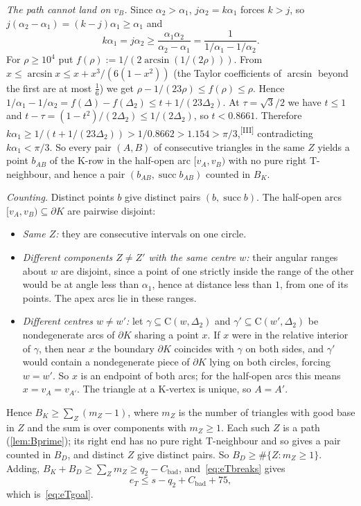 \documentclass[11pt]{amsart}
\theoremstyle{definition}
\theoremstyle{remark}
\newcommand{\Dt}{\Delta_2}
\newcommand{\Cc}{\mathrm{C}}      %
\newcommand{\chk}[1]{\textsuperscript{[#1]}}
\begin{document}
\emph{The path cannot land on $v_B$.} Since $\alpha_2>\alpha_1$, $j\alpha_2=k\alpha_1$ forces $k>j$, so $j(\alpha_2-\alpha_1)=(k-j)\alpha_1\ge\alpha_1$ and
\[
k\alpha_1=j\alpha_2\ge\frac{\alpha_1\alpha_2}{\alpha_2-\alpha_1}=\frac1{1/\alpha_1-1/\alpha_2}.
\]
For $\rho\ge10^4$ put $f(\rho):=1/(2\arcsin(1/(2\rho)))$. From $x\le\arcsin x\le x+x^3/(6(1-x^2))$ (the Taylor coefficients of $\arcsin$ beyond the first are at most $\frac16$) we get $\rho-1/(23\rho)\le f(\rho)\le\rho$. Hence $1/\alpha_1-1/\alpha_2=f(\Delta)-f(\Dt)\le t+1/(23\Dt)$. At $\tau=\sqrt3/2$ we have $t\le1$ and $t-\tau=(1-t^2)/(2\Dt)\le1/(2\Dt)$, so $t<0.8661$. Therefore $k\alpha_1\ge1/(t+1/(23\Dt))>1/0.8662>1.154>\pi/3$,\chk{III} contradicting $k\alpha_1<\pi/3$. So every pair $(A,B)$ of consecutive triangles in the same $Z$ yields a point $b_{AB}$ of the K-row in the half-open arc $[v_A,v_B)$ with no pure right T-neighbour, and hence a pair $(b_{AB},\operatorname{succ}b_{AB})$ counted in $B_K$.

\emph{Counting.} Distinct points $b$ give distinct pairs $(b,\operatorname{succ}b)$. The half-open arcs $[v_A,v_B)\subseteq\partial K$ are pairwise disjoint:
\begin{itemize}[leftmargin=2em]
\item \emph{Same $Z$:} they are consecutive intervals on one circle.
\item \emph{Different components $Z\neq Z'$ with the same centre $w$:} their angular ranges about $w$ are disjoint, since a point of one strictly inside the range of the other would be at angle less than $\alpha_1$, hence at distance less than $1$, from one of its points. The apex arcs lie in these ranges.
\item \emph{Different centres $w\neq w'$:} let $\gamma\subseteq\Cc(w,\Dt)$ and $\gamma'\subseteq\Cc(w',\Dt)$ be nondegenerate arcs of $\partial K$ sharing a point $x$. If $x$ were in the relative interior of $\gamma$, then near $x$ the boundary $\partial K$ coincides with $\gamma$ on both sides, and $\gamma'$ would contain a nondegenerate piece of $\partial K$ lying on both circles, forcing $w=w'$. So $x$ is an endpoint of both arcs; for the half-open arcs this means $x=v_A=v_{A'}$. The triangle at a K-vertex is unique, so $A=A'$.
\end{itemize}
Hence $B_K\ge\sum_Z(m_Z-1)$, where $m_Z$ is the number of triangles with good base in $Z$ and the sum is over components with $m_Z\ge1$. Each such $Z$ is a path (\cref{lem:Bprime}); its right end has no pure right T-neighbour and so gives a pair counted in $B_D$, and distinct $Z$ give distinct pairs. So $B_D\ge\#\{Z:m_Z\ge1\}$. Adding, $B_K+B_D\ge\sum_Zm_Z\ge q_2-C_{\mathrm{bad}}$, and~\eqref{eq:eTbreaks} gives
\[
e_T\le s-q_2+C_{\mathrm{bad}}+75,
\]
which is~\eqref{eq:eTgoal}.
\end{document}
